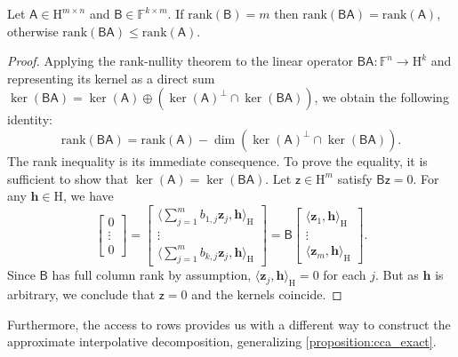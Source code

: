 \documentclass[onefignum,onetabnum]{siamart250211}
\renewenvironment{equation*}{\[}{\]\ignorespacesafterend}
\newcommand{\F}{\mathbb{F}}
\newcommand{\Hilb}{\mathrm{H}}
\newcommand{\Batrix}[1]{\bm{\Matrix{#1}}}
\newcommand{\Matrix}[1]{\mathsf{#1}}
\newcommand{\Bentry}[1]{{\bm{#1}}}
\newcommand{\rank}[2][]{\mathrm{rank} #1( #2 #1)}
\newcommand{\Dotp}[4][]{#1\langle #2, #3 #1\rangle_{\mathrm{#4}}}
\begin{document}
\begin{lemma}
\label{lemma:rank_BA}
Let $\Batrix{A} \in \Hilb^{m \times n}$ and $\Matrix{B} \in \F^{k \times m}$.
If $\rank{\Matrix{B}} = m$ then $\rank{\Matrix{B} \Batrix{A}} = \rank{\Batrix{A}}$, otherwise $\rank{\Matrix{B} \Batrix{A}} \leq \rank{\Batrix{A}}$.
\end{lemma}
\begin{proof}
Applying the rank-nullity theorem to the linear operator $\Matrix{B} \Batrix{A} : \F^n \to \Hilb^k$ and representing its kernel as a direct sum $\ker(\Matrix{B} \Batrix{A}) = \ker(\Batrix{A}) \oplus (\ker(\Batrix{A})^\perp \cap \ker(\Matrix{B} \Batrix{A}))$, we obtain the following identity:
\begin{equation*}
    \rank{\Matrix{B} \Batrix{A}} = \rank{\Batrix{A}} - \dim(\ker(\Batrix{A})^\perp \cap \ker(\Matrix{B} \Batrix{A})).
\end{equation*}
The rank inequality is its immediate consequence.
To prove the equality, it is sufficient to show that $\ker(\Batrix{A}) = \ker(\Matrix{B} \Batrix{A})$.
Let $\Batrix{z} \in \Hilb^m$ satisfy $\Matrix{B} \Batrix{z} = 0$.
For any $\Bentry{h} \in \Hilb$, we have
\begin{equation*}
    \begin{bmatrix}
        0 \\
        \vdots \\
        0
    \end{bmatrix} = 
    \begin{bmatrix}
        \Dotp{\sum_{j = 1}^{m} b_{1,j} \Bentry{z}_j}{\Bentry{h}}{\Hilb} \\
        \vdots \\
        \Dotp{\sum_{j = 1}^{m} b_{k,j} \Bentry{z}_j}{\Bentry{h}}{\Hilb}
    \end{bmatrix} = 
    \Matrix{B} \begin{bmatrix}
        \Dotp{\Bentry{z}_1}{\Bentry{h}}{\Hilb} \\
        \vdots \\
        \Dotp{\Bentry{z}_m}{\Bentry{h}}{\Hilb}
    \end{bmatrix}.
\end{equation*}
Since $\Matrix{B}$ has full column rank by assumption, $\Dotp{\Bentry{z}_j}{\Bentry{h}}{\Hilb} = 0$ for each $j$.
But as $\Bentry{h}$ is arbitrary, we conclude that $\Batrix{z} = 0$ and the kernels coincide.
\end{proof}

Furthermore, the access to rows provides us with a different way to construct the approximate interpolative decomposition, generalizing \cref{proposition:cca_exact}.
\end{document}
